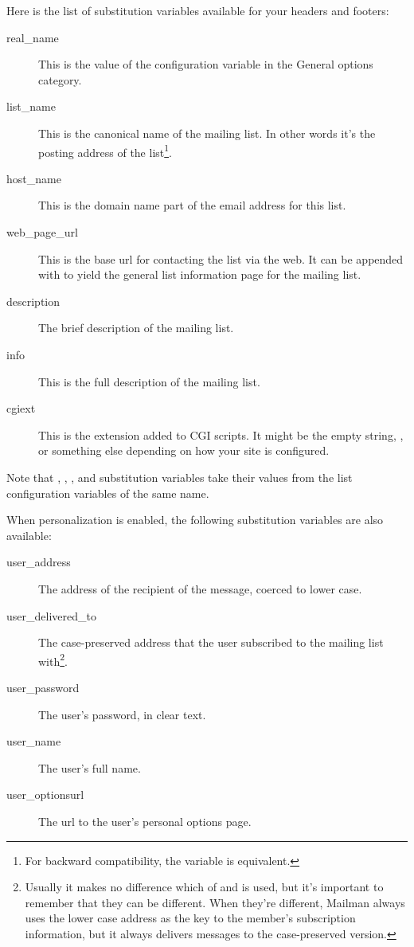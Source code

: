 \documentclass{howto}
\begin{document}
Here is the list of substitution variables available for your headers
and footers:

\begin{description}
\item[real_name]
    This is the value of the  configuration variable
    in the General options category.

\item[list_name]
    This is the canonical name of the mailing list.  In other words
    it's the posting address of the list\footnote{For backward
    compatibility, the variable  is
    equivalent.}.

\item[host_name]
    This is the domain name part of the email address for this list.

\item[web_page_url]
    This is the base url for contacting the list via the web.  It can
    be appended with  to yield the
    general list information page for the mailing list.

\item[description]
    The brief description of the mailing list.

\item[info]
    This is the full description of the mailing list.

\item[cgiext]
    This is the extension added to CGI scripts.  It might be the empty
    string, , or something else depending on how your site
    is configured.
\end{description}

Note that , , , and
 substitution variables take their values from the list
configuration variables of the same name.

When personalization is enabled, the following substitution variables
are also available:

\begin{description}
\item[user_address]
    The address of the recipient of the message, coerced to lower case.

\item[user_delivered_to]
    The case-preserved address that the user subscribed to the mailing
    list with\footnote{Usually it makes no difference which of
     and  is used, but it's
    important to remember that they can be different.  When they're
    different, Mailman always uses the lower case address as the key
    to the member's subscription information, but it always delivers
    messages to the case-preserved version.}.

\item[user_password]
    The user's password, in clear text.

\item[user_name]
    The user's full name.

\item[user_optionsurl]
    The url to the user's personal options page.
\end{description}
\end{document}
